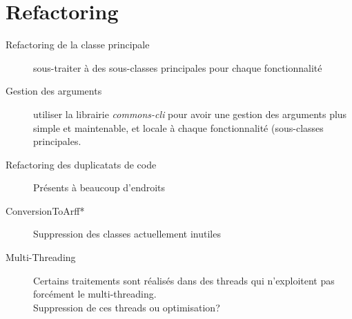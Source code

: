 \documentclass[a4paper,10pt]{report}
\begin{document}
    
  \chapter{Refactoring}
  \begin{description}
    \item[Refactoring de la classe principale] sous-traiter à des sous-classes principales pour chaque fonctionnalité
    \item[Gestion des arguments] utiliser la librairie \emph{commons-cli} pour avoir une gestion des arguments plus simple et maintenable, 
    et locale à chaque fonctionnalité (sous-classes principales.
    \item[Refactoring des duplicatats de code] Présents à beaucoup d'endroits
    \item[ConversionToArff*] Suppression des classes actuellement inutiles
    \item[Multi-Threading] Certains traitements sont réalisés dans des threads qui n'exploitent pas forcément le multi-threading.\\
    \textrightarrow Suppression de ces threads ou optimisation?
  \end{description}
\end{document}
